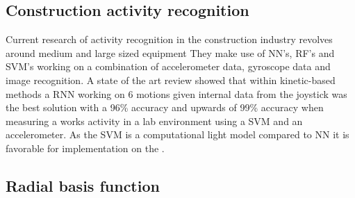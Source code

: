 \subsection{Construction activity recognition}
Current research of activity recognition in the construction industry revolves around medium and large sized equipment \cite{soaWorkersAndEquipment, activityAudioSVM, timeseriesDataAugmentationConstruction}
They make use of NN's, RF's and SVM's working on a combination of accelerometer data, gyroscope data and image recognition. 
A state of the art review showed that within kinetic-based methods a RNN working on 6 motions given internal data from the joystick was the best solution with a 96\% accuracy \cite{soaWorkersAndEquipment} and upwards of 99\% accuracy when measuring a works activity in a lab environment using a SVM and an accelerometer. 
As the SVM is a computational light model compared to NN \cite{comparisonMLAlgorithms} it is favorable for implementation on the \kin. 


\subsection{Radial basis function}
